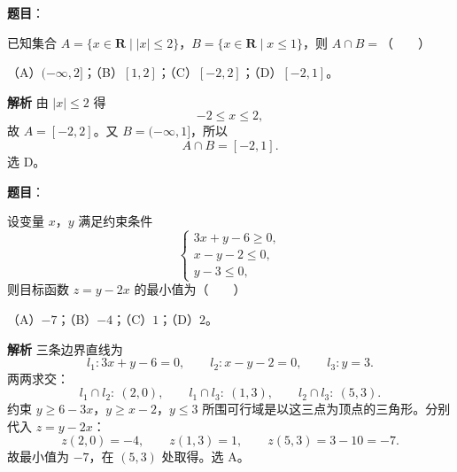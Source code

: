 

\begin{answer}

\textbf{题目}：

已知集合 $A=\{x\in\mathbf{R}\mid |x|\leqslant 2\}$，$B=\{x\in\mathbf{R}\mid x\leqslant 1\}$，则 $A\cap B=$\mbox{（　　）}

（A）$(-\infty,2]$；（B）$[1,2]$；（C）$[-2,2]$；（D）$[-2,1]$。

\textbf{解析}
由 $|x|\leqslant 2$ 得
\nopagebreak[4]
\[-2\leqslant x\leqslant 2,\]
故 $A=[-2,2]$。又 $B=(-\infty,1]$，所以
\nopagebreak[4]
\[A\cap B=[-2,1].\]
选 D。


\end{answer}
\begin{answer}

\textbf{题目}：

设变量 $x$，$y$ 满足约束条件
\nopagebreak[4]
\[\begin{cases}
3x+y-6\geqslant 0,\\
x-y-2\leqslant 0,\\
y-3\leqslant 0,
\end{cases}\]
则目标函数 $z=y-2x$ 的最小值为\mbox{（　　）}

（A）$-7$；（B）$-4$；（C）$1$；（D）$2$。

\textbf{解析}
三条边界直线为
\nopagebreak[4]
\[l_1:3x+y-6=0,\qquad l_2:x-y-2=0,\qquad l_3:y=3.\]
两两求交：
\nopagebreak[4]
\[l_1\cap l_2:\ (2,0),\qquad
l_1\cap l_3:\ (1,3),\qquad
l_2\cap l_3:\ (5,3).\]
约束 $y\geqslant 6-3x$，$y\geqslant x-2$，$y\leqslant 3$ 所围可行域是以这三点为顶点的三角形。分别代入 $z=y-2x$：
\nopagebreak[4]
\[z(2,0)=-4,\qquad z(1,3)=1,\qquad z(5,3)=3-10=-7.\]
故最小值为 $-7$，在 $(5,3)$ 处取得。选 A。


\end{answer}
